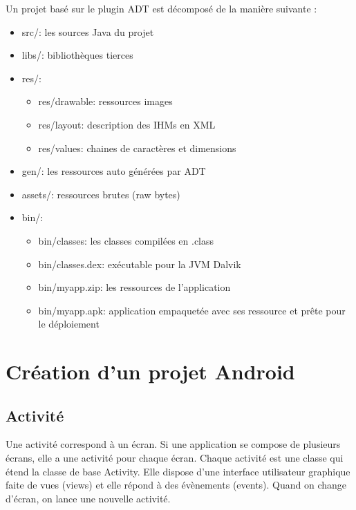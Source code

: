 \documentclass[a4paper]{report}
\begin{document}
			Un projet basé sur le plugin ADT est décomposé de la manière suivante :\\
			
			\begin{itemize}
			    	\item src/: les sources Java du projet
			    	\item libs/: bibliothèques tierces
			    	\item res/:
				\begin{itemize}
					\item res/drawable: ressources images
					\item res/layout: description des IHMs en XML
					\item res/values: chaines de caractères et dimensions
				\end{itemize}
			    	\item gen/: les ressources auto générées par ADT
			    	\item assets/: ressources brutes (raw bytes)
			    	\item bin/:
				\begin{itemize}
					\item bin/classes: les classes compilées en .class
					\item bin/classes.dex: exécutable pour la JVM Dalvik
					\item bin/myapp.zip: les ressources de l'application
					\item bin/myapp.apk: application empaquetée avec ses ressource et prête pour le déploiement		
				\end{itemize}
			\end{itemize}

	\section{Création d’un projet Android}
		\subsection{Activité}
			Une activité correspond à un écran. Si une application se compose de plusieurs écrans, elle a une activité pour chaque écran. Chaque activité est une classe qui étend la classe 				de base Activity. Elle dispose d'une interface utilisateur graphique faite de vues (views) et elle répond à des évènements (events). Quand on change d'écran, on lance une 				nouvelle activité.\\
\end{document}
